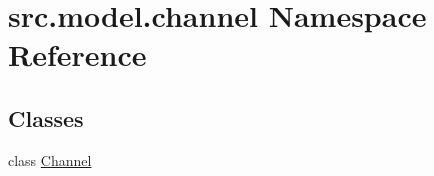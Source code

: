 \hypertarget{namespacesrc_1_1model_1_1channel}{}\section{src.\+model.\+channel Namespace Reference}
\label{namespacesrc_1_1model_1_1channel}
\subsection*{Classes}
\begin{DoxyCompactItemize}
\item 
class \hyperlink{classsrc_1_1model_1_1channel_1_1Channel}{Channel}
\end{DoxyCompactItemize}
